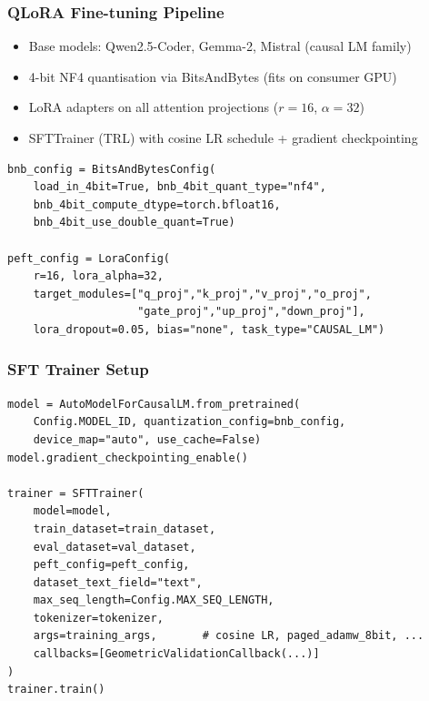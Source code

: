 
\begin{frame}[fragile]\frametitle{QLoRA Fine-tuning Pipeline}
\begin{itemize}
\item Base models: Qwen2.5-Coder, Gemma-2, Mistral (causal LM family)
\item 4-bit NF4 quantisation via BitsAndBytes (fits on consumer GPU)
\item LoRA adapters on all attention projections ($r=16$, $\alpha=32$)
\item SFTTrainer (TRL) with cosine LR schedule + gradient checkpointing
\end{itemize}
\begin{lstlisting}[basicstyle=\tiny]
bnb_config = BitsAndBytesConfig(
    load_in_4bit=True, bnb_4bit_quant_type="nf4",
    bnb_4bit_compute_dtype=torch.bfloat16,
    bnb_4bit_use_double_quant=True)

peft_config = LoraConfig(
    r=16, lora_alpha=32,
    target_modules=["q_proj","k_proj","v_proj","o_proj",
                    "gate_proj","up_proj","down_proj"],
    lora_dropout=0.05, bias="none", task_type="CAUSAL_LM")
\end{lstlisting}
\end{frame}

\begin{frame}[fragile]\frametitle{SFT Trainer Setup}
\begin{lstlisting}[basicstyle=\tiny]
model = AutoModelForCausalLM.from_pretrained(
    Config.MODEL_ID, quantization_config=bnb_config,
    device_map="auto", use_cache=False)
model.gradient_checkpointing_enable()

trainer = SFTTrainer(
    model=model,
    train_dataset=train_dataset,
    eval_dataset=val_dataset,
    peft_config=peft_config,
    dataset_text_field="text",
    max_seq_length=Config.MAX_SEQ_LENGTH,
    tokenizer=tokenizer,
    args=training_args,       # cosine LR, paged_adamw_8bit, ...
    callbacks=[GeometricValidationCallback(...)]
)
trainer.train()
\end{lstlisting}
\end{frame}

